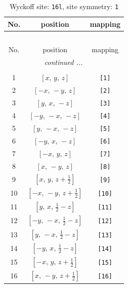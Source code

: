 \documentclass[fleqn,8pt]{jsarticle}
\begin{document}
\begin{longtable}{ccc}
\caption{Wyckoff site: {\tt 16l}, site symmetry: {\tt 1}}
 \\
 \hline \hline
No. & position & mapping \\ \hline \endfirsthead

\multicolumn{2}{l}{\tablename\ \thetable{}} \\
 \hline \hline
No. & position & mapping \\ \hline \endhead

 \hline \hline
\multicolumn{2}{r}{\footnotesize\it continued ...} \\ \endfoot

 \hline \hline
\multicolumn{2}{r}{} \\ \endlastfoot

1 & $\left[ x,\, y,\, z \right]$ & {\tt [1]} \\ \hline
2 & $\left[ - x,\, - y,\, z \right]$ & {\tt [2]} \\ \hline
3 & $\left[ y,\, x,\, - z \right]$ & {\tt [3]} \\ \hline
4 & $\left[ - y,\, - x,\, - z \right]$ & {\tt [4]} \\ \hline
5 & $\left[ y,\, - x,\, - z \right]$ & {\tt [5]} \\ \hline
6 & $\left[ - y,\, x,\, - z \right]$ & {\tt [6]} \\ \hline
7 & $\left[ - x,\, y,\, z \right]$ & {\tt [7]} \\ \hline
8 & $\left[ x,\, - y,\, z \right]$ & {\tt [8]} \\ \hline
9 & $\left[ x,\, y,\, z + \frac{1}{2} \right]$ & {\tt [9]} \\ \hline
10 & $\left[ - x,\, - y,\, z + \frac{1}{2} \right]$ & {\tt [10]} \\ \hline
11 & $\left[ y,\, x,\, \frac{1}{2} - z \right]$ & {\tt [11]} \\ \hline
12 & $\left[ - y,\, - x,\, \frac{1}{2} - z \right]$ & {\tt [12]} \\ \hline
13 & $\left[ y,\, - x,\, \frac{1}{2} - z \right]$ & {\tt [13]} \\ \hline
14 & $\left[ - y,\, x,\, \frac{1}{2} - z \right]$ & {\tt [14]} \\ \hline
15 & $\left[ - x,\, y,\, z + \frac{1}{2} \right]$ & {\tt [15]} \\ \hline
16 & $\left[ x,\, - y,\, z + \frac{1}{2} \right]$ & {\tt [16]} \\
\end{longtable}
\end{document}
